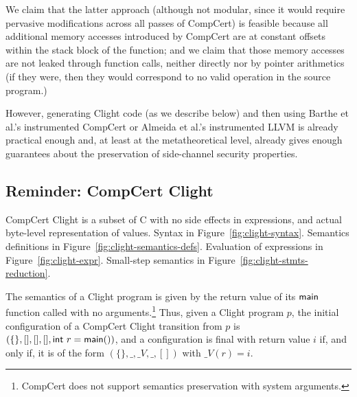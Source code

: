 {We claim that the latter approach (although not modular, since it
would require pervasive modifications across all passes of CompCert)
is feasible because all additional memory accesses introduced by
CompCert are at constant offsets within the stack block of the
function; and we claim that those memory accesses are not leaked
through function calls, neither directly nor by pointer arithmetics
(if they were, then they would correspond to no valid operation in the
source program.)

However, generating Clight code (as we describe below) and then using
Barthe et al.'s instrumented CompCert \cite{barthe-ccs2014} or Almeida
et al.'s instrumented LLVM \cite{almeida-usenix2016} is already
practical enough and, at least at the metatheoretical level, already
gives enough guarantees about the preservation of side-channel
security properties.
}

\subsection{Reminder: CompCert Clight}

CompCert Clight \cite{Blazy-Leroy-Clight-09} is a subset of C with no
side effects in expressions, and actual byte-level representation of
values. Syntax in Figure~\ref{fig:clight-syntax}. Semantics
definitions in Figure~\ref{fig:clight-semantics-defs}. Evaluation of
expressions in Figure~\ref{fig:clight-expr}. Small-step semantics in
Figure~\ref{fig:clight-stmts-reduction}.

The semantics of a Clight program is given by the return value of its
$\text{\textsf{main}}$ function called with no arguments.\footnote{CompCert does
  not support semantics preservation with system arguments.}  Thus,
given a Clight program $p$, the initial configuration of a CompCert
Clight transition from $p$ is $(\{ \}, [], [], [], \text{\textsf{int}} ~ r =
\text{\textsf{main}}())$, and a configuration is final with return value $i$ if,
and only if, it is of the form $(\{ \}, \_, \_V, \_, [])$ with $\_V(r)
= i$.

\newcommand{\claddr}[1]{\kw{\&}{#1}}
\newcommand{\clderef}[1]{\kw{*}{#1}}
\newcommand{\clread}[3]{{#1} =_{#2} \left\lbrack{#3} \right\rbrack}
\newcommand{\clwrite}[3]{{#2} =_{#1} {#3}}
\newcommand{\clvalloc}{\kw{valloc}}
\newcommand{\clalloc}{\kw{Alloc}}
\newcommand{\clunkn}{\kw{unkn}}
\newcommand{\clannot}{\kw{annot}}

